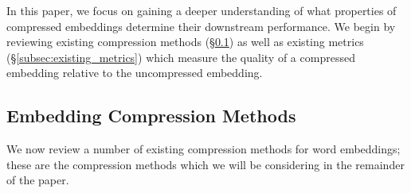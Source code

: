 In this paper, we focus on gaining a deeper understanding of what properties of compressed embeddings determine their downstream performance.
We begin by reviewing existing compression methods (\S\ref{subsec:existing_methods}) as well as existing metrics (\S\ref{subsec:existing_metrics}) which measure the quality of a compressed embedding relative to the uncompressed embedding.


\subsection{Embedding Compression Methods}
\label{subsec:existing_methods}
We now review a number of existing compression methods for word embeddings;
these are the compression methods which we will be considering in the remainder of the paper.

